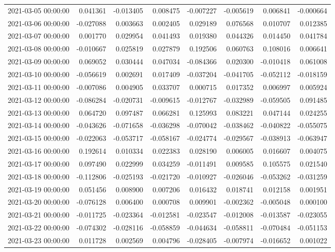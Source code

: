 \begin{tabular}{lrrrrrrr}
2021-03-05 00:00:00 & 0.041361 & -0.013405 & 0.008475 & -0.007227 & -0.005619 & 0.006841 & -0.000664 \\
2021-03-06 00:00:00 & -0.027088 & 0.003663 & 0.002405 & 0.029189 & 0.076568 & 0.010707 & 0.012385 \\
2021-03-07 00:00:00 & 0.001770 & 0.029954 & 0.041493 & 0.019380 & 0.044326 & 0.014450 & 0.041784 \\
2021-03-08 00:00:00 & -0.010667 & 0.025819 & 0.027879 & 0.192506 & 0.060763 & 0.108016 & 0.006641 \\
2021-03-09 00:00:00 & 0.069052 & 0.030444 & 0.047034 & -0.084366 & 0.020300 & -0.010418 & 0.061008 \\
2021-03-10 00:00:00 & -0.056619 & 0.002691 & 0.017409 & -0.037204 & -0.041705 & -0.052112 & -0.018159 \\
2021-03-11 00:00:00 & -0.007086 & 0.004905 & 0.033707 & 0.000715 & 0.017352 & 0.006997 & 0.005924 \\
2021-03-12 00:00:00 & -0.086284 & -0.020731 & -0.009615 & -0.012767 & -0.032989 & -0.059505 & 0.091485 \\
2021-03-13 00:00:00 & 0.064720 & 0.097487 & 0.066281 & 0.125993 & 0.083221 & 0.047144 & 0.024255 \\
2021-03-14 00:00:00 & -0.043626 & -0.071658 & -0.036298 & -0.070042 & -0.038462 & -0.040822 & -0.055075 \\
2021-03-15 00:00:00 & -0.022063 & -0.053717 & -0.058167 & -0.024774 & -0.029567 & -0.038913 & -0.063947 \\
2021-03-16 00:00:00 & 0.192614 & 0.010334 & 0.022383 & 0.028190 & 0.006005 & 0.016607 & 0.004075 \\
2021-03-17 00:00:00 & 0.097490 & 0.022999 & 0.034259 & -0.011491 & 0.009585 & 0.105575 & 0.021540 \\
2021-03-18 00:00:00 & -0.112806 & -0.025193 & -0.021720 & -0.010927 & -0.026046 & -0.053262 & -0.031259 \\
2021-03-19 00:00:00 & 0.051456 & 0.008900 & 0.007206 & 0.016432 & 0.018741 & 0.012158 & 0.001951 \\
2021-03-20 00:00:00 & -0.076128 & 0.006400 & 0.000708 & 0.009901 & -0.002362 & -0.005048 & 0.000100 \\
2021-03-21 00:00:00 & -0.011725 & -0.023364 & -0.012581 & -0.023547 & -0.012008 & -0.013587 & -0.023055 \\
2021-03-22 00:00:00 & -0.074302 & -0.028116 & -0.058859 & -0.044634 & -0.058811 & -0.070484 & -0.051153 \\
2021-03-23 00:00:00 & 0.011728 & 0.002569 & 0.004796 & -0.028405 & -0.007974 & -0.016652 & 0.001022 \\

\end{tabular}
